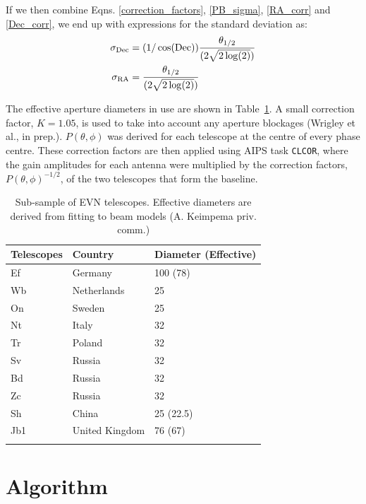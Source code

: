 \documentclass[idxtotoc,hyperref,openany]{article} %
\begin{document}
If we then combine Eqns. \ref{correction_factors}, \ref{PB_sigma}, \ref{RA_corr} and \ref{Dec_corr}, we end up with expressions for the standard deviation as:
\begin{align}
\sigma_{\rm Dec} & = (1/\cos({\rm Dec}))\frac{\theta_{1/2}}{(2\sqrt{2\log(2)})} \\
\sigma_{\rm RA} & = \frac{\theta_{1/2}}{(2\sqrt{2\log(2)})}
\end{align}

 The effective aperture diameters in use are shown in Table~\ref{table:telescopes}. A small correction factor, $K = 1.05$, is used to take into account any aperture blockages (Wrigley et al., in prep.). $P(\theta, \phi)$ was derived for each telescope at the centre of every phase centre. These correction factors are then applied using AIPS task \texttt{CLCOR}, where the gain amplitudes for each antenna were multiplied by the correction factors, $P(\theta, \phi)^{-1/2}$, of the two telescopes that form the baseline.

\begin{table}
	\centering  
	\begin{tabular}{lll}
		\hline\hline   \label{table:telescopes} 
		Telescopes & Country & Diameter (Effective)  \\
		\hline
		Ef & Germany & 100 (78) \\
		Wb & Netherlands & 25 \\
		On & Sweden & 25 \\
		Nt & Italy & 32 \\
		Tr & Poland & 32 \\
		Sv & Russia & 32 \\
		Bd & Russia & 32 \\
		Zc & Russia & 32 \\
		Sh & China & 25 (22.5)\\
		Jb1 & United Kingdom & 76 (67)\\
		\hline
		\noalign{\smallskip}
	\end{tabular}
	\caption{Sub-sample of EVN telescopes. Effective diameters are derived from fitting to beam models (A. Keimpema priv. comm.)}   
\end{table}
\section{Algorithm}
\end{document}

